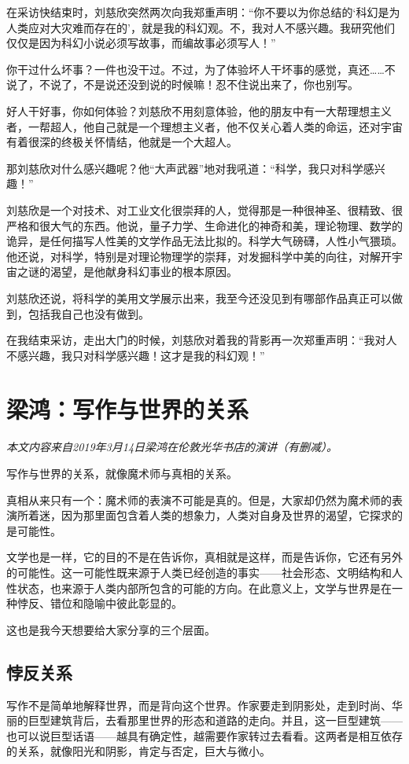 \documentclass[fontset=fandol,12pt,a5paper]{ctexbook}
\begin{document}
在采访快结束时，刘慈欣突然两次向我郑重声明：“你不要以为你总结的‘科幻是为人类应对大灾难而存在的’，就是我的科幻观。不，我对人不感兴趣。我研究他们仅仅是因为科幻小说必须写故事，而编故事必须写人！”

你干过什么坏事？一件也没干过。不过，为了体验坏人干坏事的感觉，真还……不说了，不说了，不是说还没到说的时候嘛！忍不住说出来了，你也别写。

好人干好事，你如何体验？刘慈欣不用刻意体验，他的朋友中有一大帮理想主义者，一帮超人，他自己就是一个理想主义者，他不仅关心着人类的命运，还对宇宙有着很深的终极关怀情结，他就是一个大超人。

那刘慈欣对什么感兴趣呢？他“大声武器”地对我吼道：“科学，我只对科学感兴趣！”

刘慈欣是一个对技术、对工业文化很崇拜的人，觉得那是一种很神圣、很精致、很严格和很大气的东西。他说，量子力学、生命进化的神奇和美，理论物理、数学的诡异，是任何描写人性美的文学作品无法比拟的。科学大气磅礴，人性小气猥琐。他还说，对科学，特别是对理论物理学的崇拜，对发掘科学中美的向往，对解开宇宙之谜的渴望，是他献身科幻事业的根本原因。

刘慈欣还说，将科学的美用文学展示出来，我至今还没见到有哪部作品真正可以做到，包括我自己也没有做到。

在我结束采访，走出大门的时候，刘慈欣对着我的背影再一次郑重声明：“我对人不感兴趣，我只对科学感兴趣！这才是我的科幻观！”

\newpage

\section{梁鸿：写作与世界的关系}

\emph{本文内容来自2019年3月14日梁鸿在伦敦光华书店的演讲（有删减）。}
\vspace{2em}

写作与世界的关系，就像魔术师与真相的关系。

真相从来只有一个：魔术师的表演不可能是真的。但是，大家却仍然为魔术师的表演所着迷，因为那里面包含着人类的想象力，人类对自身及世界的渴望，它探求的是可能性。

文学也是一样，它的目的不是在告诉你，真相就是这样，而是告诉你，它还有另外的可能性。这一可能性既来源于人类已经创造的事实——社会形态、文明结构和人性状态，也来源于人类内部所包含的可能的方向。在此意义上，文学与世界是在一种悖反、错位和隐喻中彼此彰显的。

这也是我今天想要给大家分享的三个层面。

\subsection{悖反关系}
写作不是简单地解释世界，而是背向这个世界。作家要走到阴影处，走到时尚、华丽的巨型建筑背后，去看那里世界的形态和道路的走向。并且，这一巨型建筑——也可以说巨型话语——越具有确定性，越需要作家转过去看看。这两者是相互依存的关系，就像阳光和阴影，肯定与否定，巨大与微小。
\end{document}
